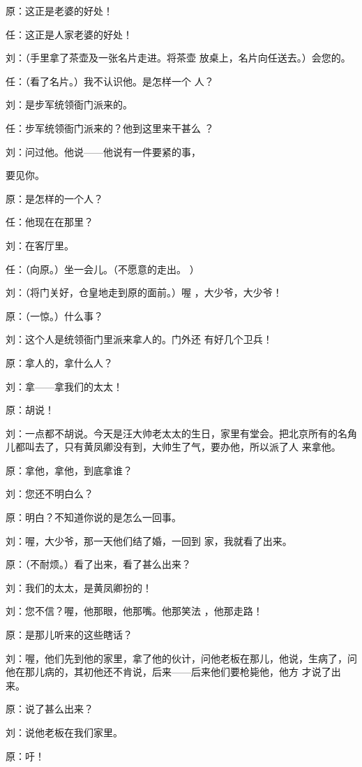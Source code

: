 \documentclass{article}
\begin{document}
原：这正是老婆的好处！ 


任：这正是人家老婆的好处！ 

刘：（手里拿了茶壶及一张名片走进。将茶壶
放桌上，名片向任送去。）会您的。 

任：（看了名片。）我不认识他。是怎样一个
人？ 


刘：是步军统领衙门派来的。 

任：步军统领衙门派来的？他到这里来干甚么
？ 

刘：问过他。他说——他说有一件要紧的事，

\newpage
要见你。 


原：是怎样的一个人？ 


任：他现在在那里？ 


刘：在客厅里。 

任：（向原。）坐一会儿。（不愿意的走出。
） 

刘：（将门关好，仓皇地走到原的面前。）喔
，大少爷，大少爷！ 


原：（一惊。）什么事？ 

刘：这个人是统领衙门里派来拿人的。门外还
有好几个卫兵！ 


原：拿人的，拿什么人？ 


\newpage

刘：拿——拿我们的太太！ 


原：胡说！ 

刘：一点都不胡说。今天是汪大帅老太太的生日，家里有堂会。把北京所有的名角儿都叫去了，只有黄凤卿没有到，大帅生了气，要办他，所以派了人
来拿他。 


原：拿他，拿他，到底拿谁？ 


刘：您还不明白么？ 


原：明白？不知道你说的是怎么一回事。 

刘：喔，大少爷，那一天他们结了婚，一回到
家，我就看了出来。 

原：（不耐烦。）看了出来，看了甚么出来？


刘：我们的太太，是黄凤卿扮的！ 

\newpage


刘：您不信？喔，他那眼，他那嘴。他那笑法
，他那走路！ 


原：是那儿听来的这些瞎话？ 

刘：喔，他们先到他的家里，拿了他的伙计，问他老板在那儿，他说，生病了，问他在那儿病的，其初他还不肯说，后来——后来他们要枪毙他，他方
才说了出来。 


原：说了甚么出来？ 


刘：说他老板在我们家里。 


原：吁！ 
\end{document}
